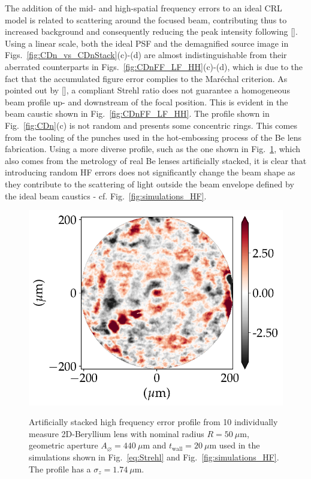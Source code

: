 \begin{refsection}
The addition of the mid- and high-spatial frequency errors to an ideal CRL model is related to scattering around the focused beam, contributing thus to increased background and consequently reducing the peak intensity following [\cite{Harvey1995a}]. Using a linear scale, both the ideal PSF and the demagnified source image in Figs.~\ref{fig:CDn_vs_CDnStack}(c)-(d) are almost indistinguishable from their aberrated counterparts in Figs.~\ref{fig:CDnFF_LF_HH}(c)-(d), which is due to the fact that the accumulated figure error complies to the Mar\'echal criterion. As pointed out by [\cite{Cocco2015, Cocco2019}], a compliant Strehl ratio does not guarantee a homogeneous beam profile up- and downstream of the focal position. This is evident in the beam caustic shown in Fig.~\ref{fig:CDnFF_LF_HH}. The profile shown in Fig.~\ref{fig:CDn}(c) is not random and presents some concentric rings. This comes from the tooling of the punches used in the hot-embossing process of the Be lens fabrication. Using a more diverse profile, such as the one shown in Fig.~\ref{fig:CDnHF}, which also comes from the metrology of real Be lenses artificially stacked, it is clear that introducing random HF errors does not significantly change the beam shape as they contribute to the scattering of light outside the beam envelope defined by the ideal beam caustics - cf. Fig.~\ref{fig:simulations_HF}. 

\begin{figure}[t]
        \centering
        {\includegraphics[width=0.3\linewidth]{figures/ch05/CDnHF/phase_n_CRL_errors_residues_phase_figure_errors_FF}}
        \caption[High frequency errors profile]{Artificially stacked high frequency error profile from 10 individually measure 2D-Beryllium lens with nominal radius $R=50~\mu\text{m}$, geometric aperture $A_{\diameter}=440~\mu\text{m}$ and $t_\text{wall}=20~\mu$m used in the simulations shown in Fig.~\ref{eq:Strehl} and Fig.~\ref{fig:simulations_HF}. The profile has a $\sigma_z=1.74~\mu$m.}\label{fig:CDnHF}
\end{figure}


\end{refsection}
